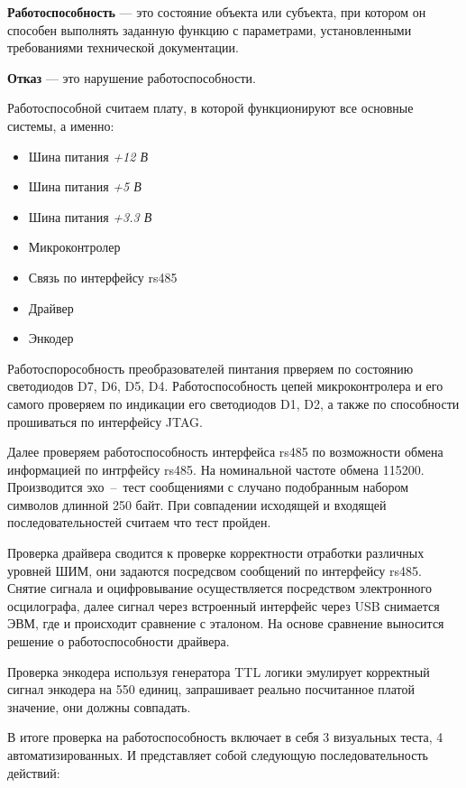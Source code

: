 \textbf{Работоспособность} --- это состояние объекта или субъекта, при котором он
способен выполнять заданную функцию с параметрами, установленными требованиями
технической документации.


\textbf{Отказ} --- это нарушение работоспособности.

Работоспособной считаем плату, в которой функционируют все основные системы,
а именно:
\begin{itemize}
    \item Шина питания \textit{+12 В}
    \item Шина питания \textit{+5 В}
    \item Шина питания \textit{+3.3 В}
    \item Микроконтролер
    \item Связь по интерфейсу rs485
    \item Драйвер
    \item Энкодер
\end{itemize}
Работоспорособность преобразователей пинтания прверяем по состоянию светодиодов
D7, D6, D5, D4. Работоспособность цепей микроконтролера и его самого проверяем
по индикации его светодиодов D1, D2, а также по способности прошиваться по
интерфейсу JTAG.

Далее проверяем работоспособность интерфейса rs485 по
возможности обмена информацией по интрфейсу rs485. На номинальной частоте обмена
115200. Производится эхо~--~тест сообщениями с случано подобранным набором
символов длинной 250 байт. При совпадении исходящей и входящей
последовательностей считаем что тест пройден.

Проверка драйвера сводится к проверке корректности отработки различных уровней
ШИМ, они задаются посредсвом сообщений по интерфейсу rs485. Снятие сигнала и
оцифровывание осуществляется посредством электронного осцилографа, далее сигнал
через встроенный интерфейс через USB снимается ЭВМ, где и происходит сравнение
с эталоном. На основе сравнение выносится решение о работоспособности драйвера.

Проверка энкодера используя генератора TTL логики эмулирует корректный сигнал
энкодера на 550 единиц, запрашивает реально посчитанное платой значение, они
должны совпадать.

В итоге проверка на работоспособность включает в себя 3 визуальных теста, 4
автоматизированных. И представляет собой следующую последовательность действий:

